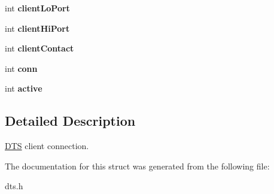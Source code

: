 \begin{CompactItemize}
\item 
\hypertarget{structdtsClient_6a46d7c22a479bdb44fa8bf8e34a944f}{
int \textbf{clientLoPort}}
\label{structdtsClient_6a46d7c22a479bdb44fa8bf8e34a944f}

\item 
\hypertarget{structdtsClient_61964db1d453105a7acabe80365b096b}{
int \textbf{clientHiPort}}
\label{structdtsClient_61964db1d453105a7acabe80365b096b}

\item 
\hypertarget{structdtsClient_eceec79dbe8d17f6b31d517b2622b22e}{
int \textbf{clientContact}}
\label{structdtsClient_eceec79dbe8d17f6b31d517b2622b22e}

\item 
\hypertarget{structdtsClient_1b289487e9c7c48e8ef154016b99374f}{
int \textbf{conn}}
\label{structdtsClient_1b289487e9c7c48e8ef154016b99374f}

\item 
\hypertarget{structdtsClient_cfa962ed404304a61c9031310abd68ec}{
int \textbf{active}}
\label{structdtsClient_cfa962ed404304a61c9031310abd68ec}

\end{CompactItemize}


\subsection{Detailed Description}
\hyperlink{structDTS}{DTS} client connection. 

The documentation for this struct was generated from the following file:\begin{CompactItemize}
\item 
dts.h\end{CompactItemize}
